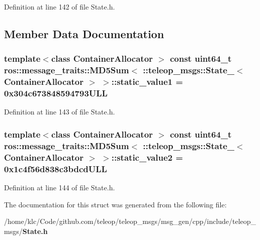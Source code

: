 Definition at line 142 of file State.h.



\subsection{Member Data Documentation}
\subsubsection[{static\_\-value1}]{\setlength{\rightskip}{0pt plus 5cm}template$<$class ContainerAllocator $>$ const uint64\_\-t ros::message\_\-traits::MD5Sum$<$ ::{\bf teleop\_\-msgs::State\_\-}$<$ ContainerAllocator $>$ $>$::{\bf static\_\-value1} = 0x304c673848594793ULL\hspace{0.3cm}{\ttfamily  [static]}}\label{structros_1_1message__traits_1_1MD5Sum_3_01_1_1teleop__msgs_1_1State___3_01ContainerAllocator_01_4_01_4_ac2b7f8ed64b76e198b358d65545379c0}


Definition at line 143 of file State.h.

\subsubsection[{static\_\-value2}]{\setlength{\rightskip}{0pt plus 5cm}template$<$class ContainerAllocator $>$ const uint64\_\-t ros::message\_\-traits::MD5Sum$<$ ::{\bf teleop\_\-msgs::State\_\-}$<$ ContainerAllocator $>$ $>$::{\bf static\_\-value2} = 0x1c4f56d838c3bdcdULL\hspace{0.3cm}{\ttfamily  [static]}}\label{structros_1_1message__traits_1_1MD5Sum_3_01_1_1teleop__msgs_1_1State___3_01ContainerAllocator_01_4_01_4_af5fc34ef5bcc2ed79654b7a1582b039f}


Definition at line 144 of file State.h.



The documentation for this struct was generated from the following file:\begin{DoxyCompactItemize}
\item 
/home/klc/Code/github.com/teleop/teleop\_\-msgs/msg\_\-gen/cpp/include/teleop\_\-msgs/{\bf State.h}\end{DoxyCompactItemize}
